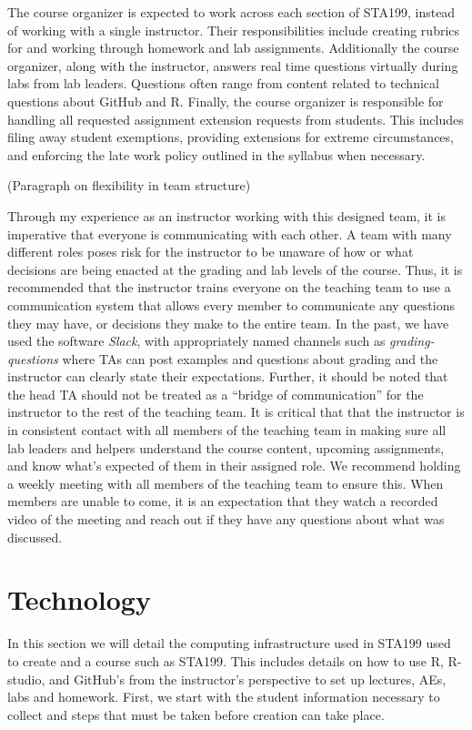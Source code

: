 \documentclass[
  12pt]{article}
\begin{document}
The course organizer is expected to work across each section of STA199,
instead of working with a single instructor. Their responsibilities
include creating rubrics for and working through homework and lab
assignments. Additionally the course organizer, along with the
instructor, answers real time questions virtually during labs from lab
leaders. Questions often range from content related to technical
questions about GitHub and R. Finally, the course organizer is
responsible for handling all requested assignment extension requests
from students. This includes filing away student exemptions, providing
extensions for extreme circumstances, and enforcing the late work policy
outlined in the syllabus when necessary.

(Paragraph on flexibility in team structure)

Through my experience as an instructor working with this designed team,
it is imperative that everyone is communicating with each other. A team
with many different roles poses risk for the instructor to be unaware of
how or what decisions are being enacted at the grading and lab levels of
the course. Thus, it is recommended that the instructor trains everyone
on the teaching team to use a communication system that allows every
member to communicate any questions they may have, or decisions they
make to the entire team. In the past, we have used the software
\emph{Slack}, with appropriately named channels such as
\emph{grading-questions} where TAs can post examples and questions about
grading and the instructor can clearly state their expectations.
Further, it should be noted that the head TA should not be treated as a
``bridge of communication'' for the instructor to the rest of the
teaching team. It is critical that that the instructor is in consistent
contact with all members of the teaching team in making sure all lab
leaders and helpers understand the course content, upcoming assignments,
and know what's expected of them in their assigned role. We recommend
holding a weekly meeting with all members of the teaching team to ensure
this. When members are unable to come, it is an expectation that they
watch a recorded video of the meeting and reach out if they have any
questions about what was discussed.

\hypertarget{sec-tech}{%
\section{Technology}\label{sec-tech}}

In this section we will detail the computing infrastructure used in
STA199 used to create and a course such as STA199. This includes details
on how to use R, R-studio, and GitHub's from the instructor's
perspective to set up lectures, AEs, labs and homework. First, we start
with the student information necessary to collect and steps that must be
taken before creation can take place.
\end{document}
